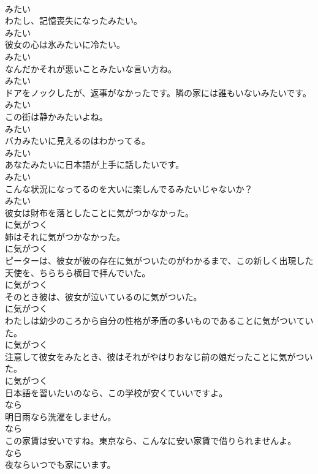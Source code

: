 \documentclass[8pt]{extreport}
\begin{document}
\begin{CJK}{UTF8}{min}
\\	みたい
\\	わたし、記憶喪失になったみたい。	
\\	みたい
\\	彼女の心は氷みたいに冷たい。	
\\	みたい
\\	なんだかそれが悪いことみたいな言い方ね。	
\\	みたい
\\	ドアをノックしたが、返事がなかったです。隣の家には誰もいないみたいです。	
\\	みたい
\\	この街は静かみたいよね。	
\\	みたい
\\	バカみたいに見えるのはわかってる。	
\\	みたい
\\	あなたみたいに日本語が上手に話したいです。	
\\	みたい
\\	こんな状況になってるのを大いに楽しんでるみたいじゃないか？	
\\	みたい
\\	彼女は財布を落としたことに気がつかなかった。	
\\	に気がつく
\\	姉はそれに気がつかなかった。	
\\	に気がつく
\\	ピーターは、彼女が彼の存在に気がついたのがわかるまで、この新しく出現した天使を、ちらちら横目で拝んでいた。	
\\	に気がつく
\\	そのとき彼は、彼女が泣いているのに気がついた。	
\\	に気がつく
\\	わたしは幼少のころから自分の性格が矛盾の多いものであることに気がついていた。	
\\	に気がつく
\\	注意して彼女をみたとき、彼はそれがやはりおなじ前の娘だったことに気がついた。	
\\	に気がつく
\\	日本語を習いたいのなら、この学校が安くていいですよ。	
\\	なら
\\	明日雨なら洗濯をしません。	
\\	なら
\\	この家賃は安いですね。東京なら、こんなに安い家賃で借りられませんよ。	
\\	なら
\\	夜ならいつでも家にいます。	

\end{CJK}
\end{document}
